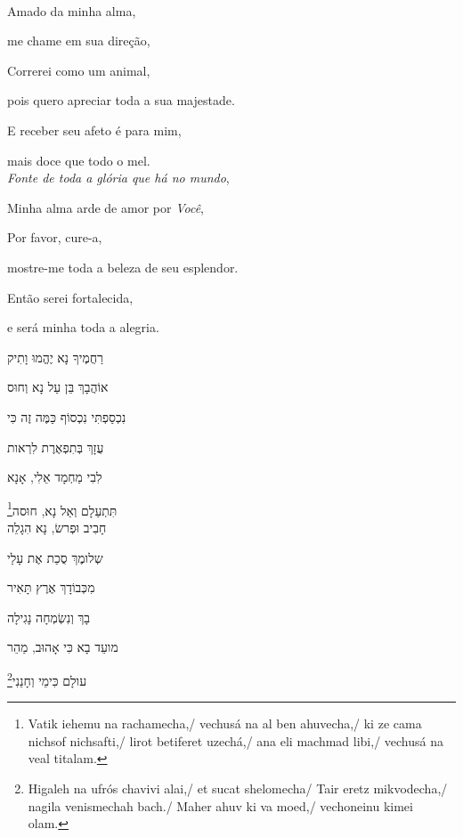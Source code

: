 \textbf{}\\[15pt]

Amado da minha alma,

me chame em sua direção,

Correrei como um animal,

pois quero apreciar toda a sua majestade.

E receber seu afeto é para mim,

mais doce que todo o mel.\\[10pt]

\emph{Fonte de toda a glória que há no mundo},

Minha alma arde de amor por \emph{Você},

Por favor, cure-a,

mostre-me toda a beleza de seu esplendor.

Então serei fortalecida,

e será minha toda a alegria.\\[10pt]

\movetoevenpage
\raggedleft

\vspace*{1cm}

רַחֲמֶיךָ נָא יֶהֱמוּ וָתִיק 

אוֹהֲבָךְ בֵּן עַל נָא וְחוּס 

נִכְסַפְתִּי נִכְסוֹף כַּמֶּה זֶה כִּי 

עֻזָךְ בְּתִפְאֶרֶת לִרְאות 

לִבִי מַחְמָד אֵלִי, אָנָא 

תִּתְעַלָם וְאַל נָא, חוּסה\footnote{Vatik iehemu na rachamecha,/
vechusá na al ben ahuvecha,/ ki ze cama nichsof nichsafti,/ lirot betiferet uzechá,/
ana eli machmad libi,/ vechusá na veal titalam.}\\[10pt]

חָבִיב וּפְרשׂ, נָא הִגָלֵה

שְלומֶךְ סֻכַת אֶת עָלַי 

מִכְּבוֹדָךְ אֶרֶץ תָּאִיר 

בָךְ וְנִשְׂמְחָה נָגִילָה 

מועֵד בָא כִּי אָהוּב, מַהֵר

עולָם כִּימֵי וְחָנֵנִי\footnote{
Higaleh na ufrós chavivi alai,/
et sucat shelomecha/ Tair eretz mikvodecha,/ nagila venismechah bach./ Maher ahuv ki va moed,/
vechoneinu kimei olam.}

\movetooddpage
\raggedright

\vspace*{1cm}

